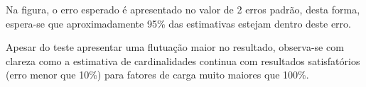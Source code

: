 Na figura, o erro esperado é apresentado no valor de 2 erros padrão, desta forma, espera-se que aproximadamente 95\% das estimativas estejam dentro deste erro.

Apesar do teste apresentar uma flutuação maior no resultado, observa-se com clareza como a estimativa de cardinalidades continua com resultados satisfatórios (erro menor que 10\%) para fatores de carga muito maiores que 100\%.